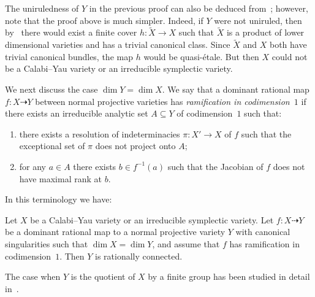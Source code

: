 \begin{rema}\label{rema:main3.3}
The uniruledness of $Y$ in the previous proof can also be deduced from~\cite[Theorem~14]{KL09}; however, note that the proof above is much simpler. Indeed, if $Y$ were not uniruled, then by~\cite[Theorem~14]{KL09} there would exist a finite cover $h\colon \widetilde X \to X$ such that $\widetilde X$ is a product of lower dimensional varieties and has a trivial canonical class. Since $\widetilde X$ and $X$ both have trivial canonical bundles, the map $h$ would be quasi-étale. But then $X$ could not be a Calabi--Yau variety or an irreducible symplectic variety.
\end{rema}

We next discuss the case $\dim Y = \dim X.$ We say that a dominant rational map $f\colon X\dashrightarrow Y$ between normal projective varieties has \emph{ramification in codimension~$1$} if there exists an irreducible analytic set $A \subseteq Y$ of codimension~$1$ such that:
\begin{enumerate}\romanenumi
\item \label{list-sec3.1}there exists a resolution of indeterminacies $\pi\colon X' \to X$ of $f$ such that the exceptional set of $\pi$ does not project onto $A$;
\item \label{list-sec3.2}for any $a \in A$ there exists $b \in f^{-1}(a)$ such that the Jacobian of $f$ does not have maximal rank at $b$.
\end{enumerate}

In this terminology we have:
\begin{theo}\label{thm1-2}
Let $X$ be a Calabi--Yau variety or an irreducible symplectic variety. Let $f\colon X \dasharrow Y$ be a dominant rational map to a normal projective variety $Y$ with canonical singularities such that $\dim X = \dim Y$, and assume that $f$ has ramification in codimension~$1$. Then $Y$ is rationally connected.
\end{theo}

The case when $Y$ is the quotient of $X$ by a finite group has been studied in detail in~\cite{KL09}.

